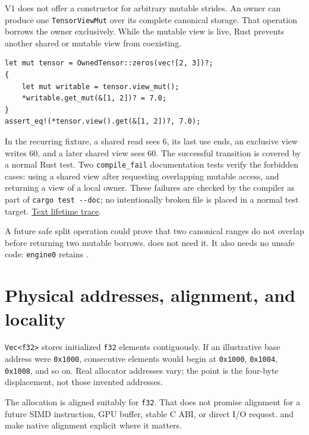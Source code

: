 V1 does not offer a constructor for arbitrary mutable strides. An owner
can produce one \texttt{TensorViewMut} over its complete canonical
storage. That operation borrows the owner exclusively. While the mutable
view is live, Rust prevents another shared or mutable view from
coexisting.

\begin{verbatim}
let mut tensor = OwnedTensor::zeros(vec![2, 3])?;
{
    let mut writable = tensor.view_mut();
    *writable.get_mut(&[1, 2])? = 7.0;
}
assert_eq!(*tensor.view().get(&[1, 2])?, 7.0);
\end{verbatim}


In the recurring fixture, a shared read sees 6, its last use ends, an
exclusive view writes 60, and a later shared view sees 60. The
successful transition is covered by a normal Rust test. Two
\texttt{compile\_fail} documentation tests verify the forbidden cases:
using a shared view after requesting overlapping mutable access, and
returning a view of a local owner. These failures are checked by the
compiler as part of \texttt{cargo\ test\ -\/-doc}; no intentionally
broken file is placed in a normal test target.
\href{https://github.com/hermonai/inside-the-llm-engine/blob/astra-visual-rewrite/figures/generated/tensor-lifetime.txt}{Text
lifetime trace}.

A future safe split operation could prove that two canonical ranges do
not overlap before returning two mutable borrows.  does not
need it. It also needs no unsafe code: \texttt{engine0} retains
\texttt{}.

\section{Physical addresses, alignment, and
locality}\label{physical-addresses-alignment-and-locality}

\texttt{Vec\textless{}f32\textgreater{}} stores initialized \texttt{f32}
elements contiguously. If an illustrative base address were
\texttt{0x1000}, consecutive elements would begin at \texttt{0x1000},
\texttt{0x1004}, \texttt{0x1008}, and so on. Real allocator addresses
vary; the point is the four-byte displacement, not those invented
addresses.

The allocation is aligned suitably for \texttt{f32}. That does not
promise alignment for a future SIMD instruction, GPU buffer, stable C
ABI, or direct I/O request.  and  make native
alignment explicit where it matters.

